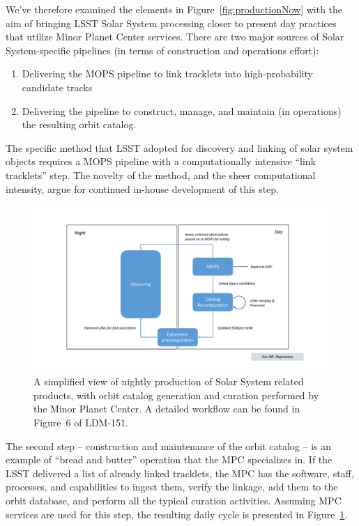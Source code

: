 \documentclass[DM,authoryear,toc,lsstdraft]{lsstdoc}
\begin{document}
We've therefore examined the elements in Figure~\ref{fig:productionNow} with the aim of bringing LSST Solar System processing closer to present day practices that utilize Minor Planet Center services. There are two major sources of Solar System-specific pipelines (in terms of construction and operations effort):
\begin{enumerate}
	\item Delivering the MOPS pipeline to link tracklets into high-probability candidate tracks
	\item Delivering the pipeline to construct, manage, and maintain (in operations) the resulting orbit catalog.
\end{enumerate}
The specific method that LSST adopted for discovery and linking of solar system objects requires a MOPS pipeline with a computationally intensive ``link tracklets'' step. The novelty of the method, and the sheer computational intensity, argue for continued in-house development of this step.

\begin{figure}
	\caption{A simplified view of nightly production of Solar System related products, with orbit catalog generation and curation performed by the Minor Planet Center. A detailed workflow can be found in Figure~6 of LDM-151.\label{fig:productionNew}}
	\centering
	\includegraphics[page=2,width=1.0\textwidth]{figures/processing.pdf}
\end{figure}

The second step -- construction and maintenance of the orbit catalog -- is an example of ``bread and butter'' operation that the MPC specializes in. If the LSST delivered a list of already linked tracklets, the MPC has the software, staff,  processes, and capabilities to ingest them, verify the linkage, add them to the orbit database, and perform all the typical curation activities. Assuming MPC services are used for this step, the resulting daily cycle is presented in Figure~\ref{fig:productionNew}.
\end{document}
